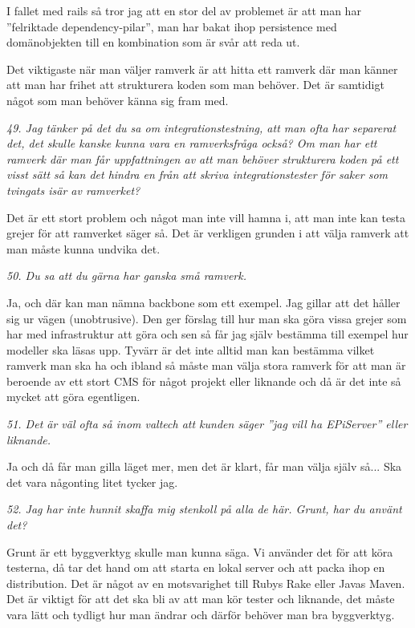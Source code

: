 \documentclass[11pt]{article}
\begin{document}
I fallet med rails så tror jag att en stor del av problemet är att man har ”felriktade dependency-pilar”, man har bakat ihop persistence med domänobjekten till en kombination som är svår att reda ut.

Det viktigaste när man väljer ramverk är att hitta ett ramverk där man känner att man har frihet att strukturera koden som man behöver. Det är samtidigt något som man behöver känna sig fram med.

\emph{49. Jag tänker på det du sa om integrationstestning, att man ofta har separerat det, det skulle kanske kunna vara en ramverksfråga också? Om man har ett ramverk där man får uppfattningen av att man behöver strukturera koden på ett visst sätt så kan det hindra en från att skriva integrationstester för saker som tvingats isär av ramverket?}

Det är ett stort problem och något man inte vill hamna i, att man inte kan testa grejer för att ramverket säger så. Det är verkligen grunden i att välja ramverk att man måste kunna undvika det.

\emph{50. Du sa att du gärna har ganska små ramverk.}

Ja, och där kan man nämna backbone som ett exempel. Jag gillar att det håller sig ur vägen (unobtrusive). Den ger förslag till hur man ska göra vissa grejer som har med infrastruktur att göra och sen så får jag själv bestämma till exempel hur modeller ska läsas upp. Tyvärr är det inte alltid man kan bestämma vilket ramverk man ska ha och ibland så måste man välja stora ramverk för att man är beroende av ett stort CMS för något projekt eller liknande och då är det inte så mycket att göra egentligen.

\emph{51. Det är väl ofta så inom valtech att kunden säger ”jag vill ha EPiServer” eller liknande.}

Ja och då får man gilla läget mer, men det är klart, får man välja själv så... Ska det vara någonting litet tycker jag.

\emph{52. Jag har inte hunnit skaffa mig stenkoll på alla de här. Grunt, har du använt det?}

Grunt är ett byggverktyg skulle man kunna säga. Vi använder det för att köra testerna, då tar det hand om att starta en lokal server och att packa ihop en distribution. Det är något av en motsvarighet till Rubys Rake eller Javas Maven. Det är viktigt för att det ska bli av att man kör tester och liknande, det måste vara lätt och tydligt hur man ändrar och därför behöver man bra byggverktyg.
\end{document}
